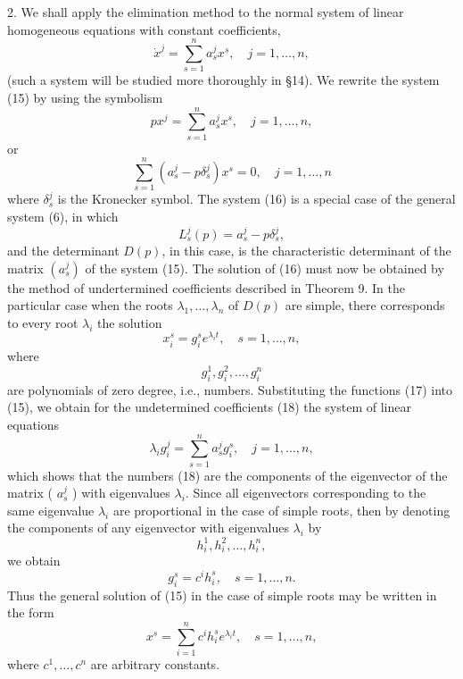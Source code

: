 \documentclass[10pt,a5paper]{book}
\theoremstyle{plain}
\theoremstyle{definition}
\theoremstyle{remark}
\begin{document}
2. We shall apply the elimination method to the normal system of linear homogeneous equations with constant coefficients,
\begin{equation*}
\dot{x}^{j}=\sum_{s=1}^{n} a_{s}^{j} x^{s}, \quad j=1, \ldots, n, \tag{15}
\end{equation*}
(such a system will be studied more thoroughly in §14). We rewrite the system (15) by using the symbolism
\[
p x^{j}=\sum_{s=1}^{n} a_{s}^{j} x^{s}, \quad j=1, \ldots, n,
\]
or
\begin{equation*}
\sum_{s=1}^{n}\left(a_{s}^{j}-p \delta_{s}^{j}\right) x^{s}=0, \quad j=1, \ldots, n \tag{16}
\end{equation*}
where $\delta_{s}^{j}$ is the Kronecker symbol. The system (16) is a special case of the
general system (6), in which
\[
L_{s}^{j}(p)=a_{s}^{j}-p \delta_{s}^{j},
\]
and the determinant $D(p)$, in this case, is the characteristic determinant of the matrix $\left(a_{s}^{j}\right)$ of the system (15). The solution of (16) must now be obtained by the method of undertermined coefficients described in Theorem 9. In the particular case when the roots $\lambda_{1}, \ldots, \lambda_{n}$ of $D(p)$ are simple, there corresponds to every root $\lambda_{i}$ the solution
\begin{equation*}
x_{i}^{s}=g_{i}^{s} e^{\lambda_{i} t}, \quad s=1, \ldots, n, \tag{17}
\end{equation*}
where
\begin{equation*}
g_{i}^{1}, g_{i}^{2}, \ldots, g_{i}^{n} \tag{18}
\end{equation*}
are polynomials of zero degree, i.e., numbers. Substituting the functions (17) into (15), we obtain for the undetermined coefficients (18) the system of linear equations
\[
\lambda_{i} g_{i}^{j}=\sum_{s=1}^{n} a_{s}^{j} g_{i}^{s}, \quad j=1, \ldots, n,
\]
which shows that the numbers (18) are the components of the eigenvector of the matrix ( $a_{s}^{j}$ ) with eigenvalues $\lambda_{i}$. Since all eigenvectors corresponding to the same eigenvalue $\lambda_{i}$ are proportional in the case of simple roots, then by denoting the components of any eigenvector with eigenvalues $\lambda_{i}$ by
\[
h_{i}^{1}, h_{i}^{2}, \ldots, h_{i}^{n},
\]
we obtain
\[
g_{i}^{s}=c^{i} h_{i}^{s}, \quad s=1, \ldots, n .
\]
Thus the general solution of (15) in the case of simple roots may be written in the form
\[
x^{s}=\sum_{i=1}^{n} c^{i} h_{i}^{s} e^{\lambda_{i} t}, \quad s=1, \ldots, n,
\]
where $c^{1}, \ldots, c^{n}$ are arbitrary constants.
\end{document}
